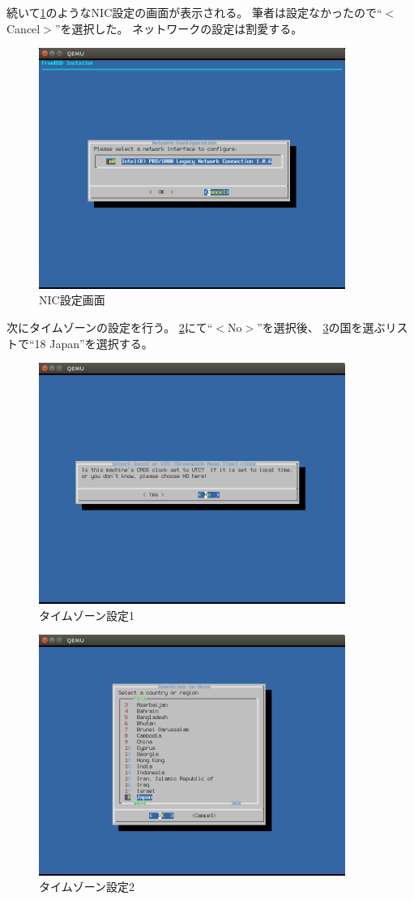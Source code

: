\documentclass[a4j]{jarticle}
\begin{document}
続いて\ref{fig:FreeBSD_NIC}のようなNIC設定の画面が表示される。
筆者は設定なかったので``$<$Cancel$>$''を選択した。
ネットワークの設定は割愛する。
\begin{figure}[htbp]
	\centering
	\includegraphics[width=10cm]{./IMG/FreeBSD_NIC.png}
    \caption{NIC設定画面}
    \label{fig:FreeBSD_NIC}
\end{figure}

次にタイムゾーンの設定を行う。
\ref{fig:FreeBSD_TIM}にて``$<$No$>$''を選択後、
\ref{fig:FreeBSD_TIM2}の国を選ぶリストで``18 Japan''を選択する。
\begin{figure}[htbp]
	\includegraphics[width=10cm]{./IMG/FreeBSD_TIM.png}
	\centering
    \caption{タイムゾーン設定1}
    \label{fig:FreeBSD_TIM}
\end{figure}
\begin{figure}[htbp]
	\centering
	\includegraphics[width=10cm]{./IMG/FreeBSD_TIM_JP.png}
    \caption{タイムゾーン設定2}
	\label{fig:FreeBSD_TIM2}
\end{figure}
\end{document}
